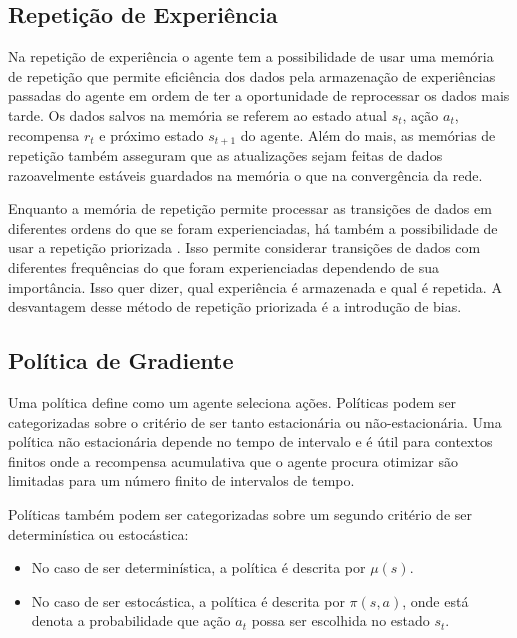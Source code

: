 \subsection{Repetição de Experiência}

Na repetição de experiência o agente tem a possibilidade de usar uma memória de repetição que permite eficiência dos dados pela armazenação de experiências passadas do agente em ordem de ter a oportunidade de reprocessar os dados mais tarde.
Os dados salvos na memória se referem ao estado atual $s_t$, ação $a_t$, recompensa $r_t$ e próximo estado $s_{t+1}$ do agente.
Além do mais, as memórias de repetição também asseguram que as atualizações sejam feitas de dados razoavelmente estáveis guardados na memória o que na convergência da rede.

Enquanto a memória de repetição permite processar as transições de dados em diferentes ordens do que se foram experienciadas, há também a possibilidade de usar a repetição priorizada \cite{schaul2015prioritized}. Isso permite considerar transições de dados com diferentes frequências do que foram experienciadas dependendo de sua importância. Isso quer dizer, qual experiência é armazenada e qual é repetida.
A desvantagem desse método de repetição priorizada é a introdução de bias.

\subsection{Política de Gradiente}

Uma política define como um agente seleciona ações. Políticas podem ser categorizadas sobre o critério de ser tanto estacionária ou não-estacionária.
Uma política não estacionária depende no tempo de intervalo e é útil para contextos finitos onde a recompensa acumulativa que o agente procura otimizar são limitadas para um número finito de intervalos de tempo.

Políticas também podem ser categorizadas sobre um segundo critério de ser determinística ou estocástica:

\begin{itemize}
    \item No caso de ser determinística, a política é descrita por $\mu (s)$.
    \item No caso de ser estocástica, a política é descrita por $\pi (s,a)$, onde está denota a probabilidade que ação $a_t$ possa ser escolhida no estado $s_t$.
\end{itemize}

